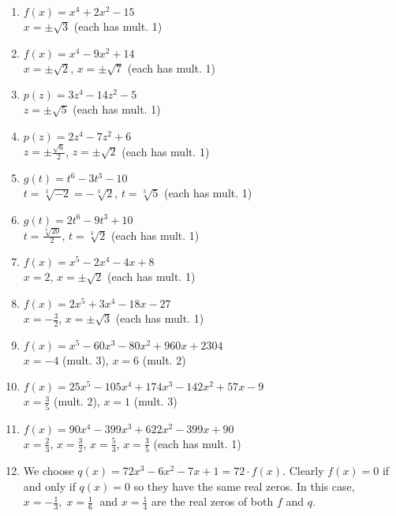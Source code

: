 \documentclass{ximera}
\begin{document}
\begin{enumerate}
\item $f(x) = x^4+2x^2 - 15$ \\ $x = \pm \sqrt{3}$ (each has mult. 1)
\item $f(x) = x^4-9x^2+14$ \\ $x = \pm \sqrt{2}$, $x = \pm \sqrt{7}$ (each has mult. 1)

\item $p(z) = 3z^4-14z^2-5$ \\ $z = \pm \sqrt{5}$ (each has mult. 1)
\item $p(z)  = 2z^4-7z^2+6$ \\  $z = \pm \frac{\sqrt{6}}{2}$, $z = \pm \sqrt{2}$ (each has mult. 1)

\item $g(t) = t^6-3t^3-10$ \\ $t = \sqrt[3]{-2} = -\sqrt[3]{2}$, $t = \sqrt[3]{5}$ (each has mult. 1)
\item $g(t) = 2t^6-9t^3+10$ \\ $t =\frac{\sqrt[3]{20}}{2} $, $t = \sqrt[3]{2}$ (each has mult. 1)


\item $f(x) = x^5-2x^4-4x+8$ \\ $x = 2$, $x = \pm \sqrt{2}$ (each has mult. 1)
\item $f(x) = 2x^5+3x^4-18x-27$ \\ $x = -\frac{3}{2}$, $x = \pm \sqrt{3}$ (each has mult. 1)

\item $f(x) = x^{5} - 60x^{3} - 80x^{2} + 960x + 2304 $ \\ $x = -4$ (mult. 3), $x = 6$ (mult. 2)


\item $f(x) = 25x^{5} - 105x^{4} + 174x^{3} - 142x^{2} + 57x - 9$ \\ $x = \frac{3}{5}$ (mult. 2), $x = 1$ (mult. 3)

\item $f(x) = 90x^{4} - 399x^{3} + 622x^{2} - 399x + 90$ \\ $x = \frac{2}{3}$, $x = \frac{3}{2}$, $x = \frac{5}{3}$, $x = \frac{3}{5}$ (each has mult. 1)


\item We choose $q(x) = 72x^{3} - 6x^{2} - 7x + 1 = 72 \cdot f(x)$.  Clearly $f(x) = 0$ if and only if $q(x) = 0$ so they have the same real zeros.  In this case, $x = -\frac{1}{3}, \; x = \frac{1}{6} \;$ and $x = \frac{1}{4}$ are the real zeros of both $f$ and $q$.


\setcounter{HW}{\value{enumi}}
\end{enumerate}
\end{document}
